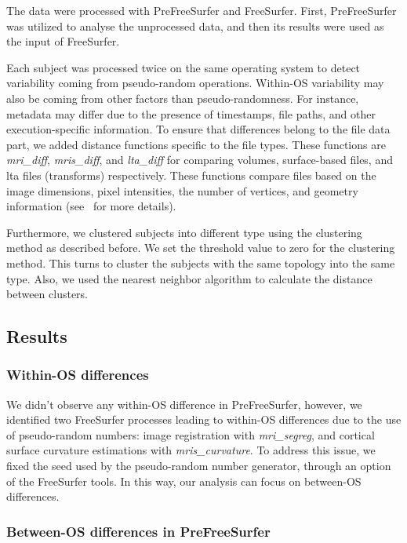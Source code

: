 \documentclass[a4paper,num-refs]{oup-contemporary}
\begin{document}
The data were processed with PreFreeSurfer and FreeSurfer. 
First, PreFreeSurfer was utilized to analyse the unprocessed data, and then its 
results were used as the input of FreeSurfer.

Each subject was processed twice on the same operating system to detect
variability coming from pseudo-random operations. 
Within-OS variability may also be coming from other factors than pseudo-randomness. 
For instance, metadata may differ due to the presence of timestamps, 
file paths, and other execution-specific information. 
To ensure that differences belong to the file data part, 
we added distance functions specific to the file types.
These functions are \emph{mri\_diff}, \emph{mris\_diff}, and \emph{lta\_diff} 
for comparing volumes, surface-based files, 
and lta files (transforms) respectively. 
These functions compare files based on the image dimensions, 
pixel intensities, the number of vertices, and geometry information
(see~\cite{fischl2012freesurfer} for more details). 

Furthermore, we clustered subjects into different type using 
the clustering method as described before.
We set the threshold value to zero for the clustering method. 
This turns to cluster the subjects with the same topology into the same type.
Also, we used the nearest neighbor algorithm to calculate the distance between clusters.

\subsection{Results}

\subsubsection{Within-OS differences}

We didn't observe any within-OS difference in PreFreeSurfer, however, we
identified two FreeSurfer processes leading to within-OS differences due
to the use of pseudo-random numbers: image registration with
\emph{mri\_segreg}, and cortical surface curvature
estimations with \emph{mris\_curvature}. To address this issue, we fixed
the seed used by the pseudo-random number generator, through an option of
the FreeSurfer tools. In this way, our analysis can focus on between-OS
differences. 

\subsubsection{Between-OS differences in PreFreeSurfer}
\end{document}
